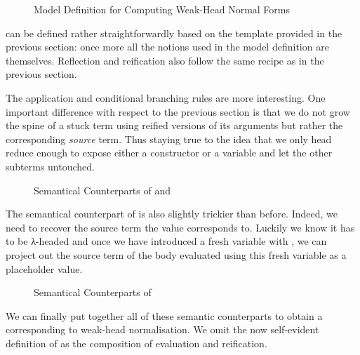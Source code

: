 \begin{figure}[h]
\caption{Model Definition for Computing Weak-Head Normal Forms\label{fig:betaiotamodel}}
\end{figure}

 can be defined rather straightforwardly based on the template provided
in the previous section: once more all the notions used in the model definition
are  themselves. Reflection and reification also follow the same recipe
as in the previous section.


The application and conditional branching rules are more
interesting. One important difference with respect to the previous
section is that we do not grow the spine of a stuck term using
reified versions of its arguments but rather the corresponding
\emph{source} term. Thus staying true to the idea that we only head
reduce enough to expose either a constructor or a variable and let
the other subterms untouched.

\begin{figure}[h]
\caption{Semantical Counterparts of  and \label{fig:betaiotaappifte}}
\end{figure}

The semantical counterpart of  is also slightly trickier than before. Indeed, we
need to recover the source term the value corresponds to. Luckily we know it has to be
λ-headed and once we have introduced a fresh variable with , we can project
out the source term of the body evaluated using this fresh variable as a placeholder
value.

\begin{figure}[h]
\caption{Semantical Counterparts of \label{fig:betaiotalam}}
\end{figure}

We can finally put together all of these semantic counterparts to
obtain a  corresponding to weak-head normalisation.
We omit the now self-evident definition of  as the
composition of evaluation and reification.
